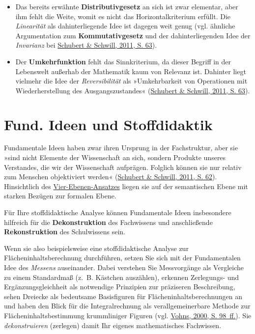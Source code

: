 \documentclass[
  ngerman,
]{scrbook}
\providecommand{\tightlist}{%
  \setlength{\itemsep}{0pt}\setlength{\parskip}{0pt}}
\theoremstyle{definition}
\theoremstyle{definition}
\theoremstyle{definition}
\theoremstyle{definition}
\theoremstyle{remark}
\begin{document}
\begin{itemize}
\tightlist
\item
  Das bereits erwähnte \textbf{Distributivgesetz} an sich ist zwar elementar, aber ihm fehlt die Weite, womit es nicht das Horizontalkriterium erfüllt. Die \emph{Linearität} als dahinterliegende Idee ist dagegen weit genug (vgl. ähnliche Argumentation zum \textbf{Kommutativgesetz} und der dahinterliegenden Idee der \emph{Invarianz} bei \protect\hyperlink{ref-Schubert:2011}{Schubert \& Schwill, 2011, S. 63}).
\item
  Der \textbf{Umkehrfunktion} fehlt das Sinnkriterium, da dieser Begriff in der Lebenswelt außerhab der Mathematik kaum von Relevanz ist. Dahinter liegt vielmehr die Idee der \emph{Reversibilität} als »Umkehrbarkeit von Operationen mit Wiederherstellung des Ausgangszustandes« (\protect\hyperlink{ref-Schubert:2011}{Schubert \& Schwill, 2011, S. 63}).
\end{itemize}

\hypertarget{fund.-ideen-und-stoffdidaktik}{%
\section{Fund. Ideen und Stoffdidaktik}\label{fund.-ideen-und-stoffdidaktik}}

Fundamentale Ideen haben zwar ihren Ursprung in der Fachstruktur, aber sie »sind nicht Elemente der Wissenschaft an sich, sondern Produkte unseres Verstandes, die wir der Wissenschaft aufprägen. Folglich können sie nur relativ zum Menschen objektiviert werden« (\protect\hyperlink{ref-Schubert:2011}{Schubert \& Schwill, 2011, S. 62}). Hinsichtlich des \protect\hyperlink{tab:fragen-ebenen}{Vier-Ebenen-Ansatzes} liegen sie auf der \textcolor{semanticColor}{semantischen Ebene} mit starken Bezügen zur \textcolor{formalColor}{formalen Ebene}.

Für Ihre stoffdidaktische Analyse können Fundamentale Ideen insbesondere hilfreich für die \textbf{Dekonstruktion} des Fachwissens und anschließende \textbf{Rekonstruktion} des Schulwissens sein.

Wenn sie also beispielsweise eine stoffdidaktische Analyse zur Flächeninhaltsberechnung durchführen, setzen Sie sich mit der Fundamentalen Idee des \emph{Messens} auseinander. Dabei verstehen Sie Messvorgänge als Vergleiche zu einem Standardmaß (z.~B. Kästchen auszählen), erkennen Zerlegungs- und Ergänzungsgleichheit als notwendige Prinzipien zur präziseren Beschreibung, sehen Dreiecke als bedeutsame Basisfiguren für Flächeninhaltsberechnungen an und haben den Blick für die Integralrechnung als verallgemeinerbare Methode zur Flächeninhaltsbestimmung krummliniger Figuren (vgl. \protect\hyperlink{ref-Vohns:2000}{Vohns, 2000, S. 98~ff.}). Sie \emph{dekonstruieren} (zerlegen) damit Ihr eigenes mathematisches Fachwissen.
\end{document}

